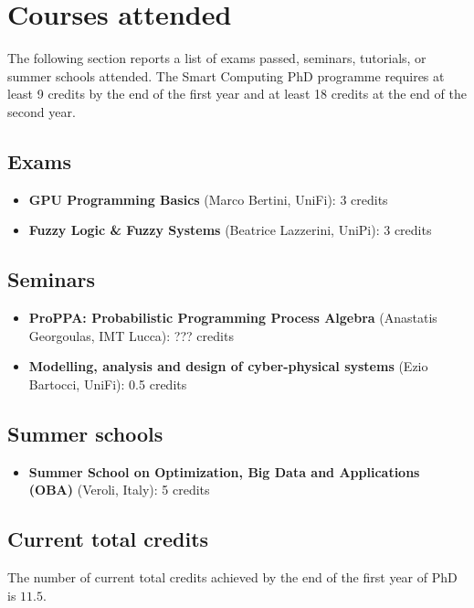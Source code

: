 
\section*{Courses attended}
  The following section reports a list of exams passed, seminars, tutorials, or summer schools attended. The Smart Computing \ac{PhD} programme requires at least 9 credits by the end of the first year and at least 18 credits at the end of the second year.

  \subsection*{Exams}
  
    \begin{itemize}
      \item \textbf{GPU Programming Basics} (Marco Bertini, UniFi): 3 credits
      \item \textbf{Fuzzy Logic \& Fuzzy Systems} (Beatrice Lazzerini, UniPi): 3 credits
    \end{itemize}
    
  \subsection*{Seminars}
  
    \begin{itemize}
      \item \textbf{ProPPA: Probabilistic Programming Process Algebra} (Anastatis Georgoulas, IMT Lucca): ??? credits
      \item \textbf{Modelling, analysis and design of cyber-physical systems} (Ezio Bartocci, UniFi): 0.5 credits
    \end{itemize}
    
  \subsection*{Summer schools}
  
    \begin{itemize}
      \item \textbf{Summer School on Optimization, Big Data and Applications (OBA)} (Veroli, Italy): 5 credits
    \end{itemize}
    
  \subsection*{Current total credits}
  
    The number of current total credits achieved by the end of the first year of \ac{PhD} is $11.5$.
    
\newpage
  